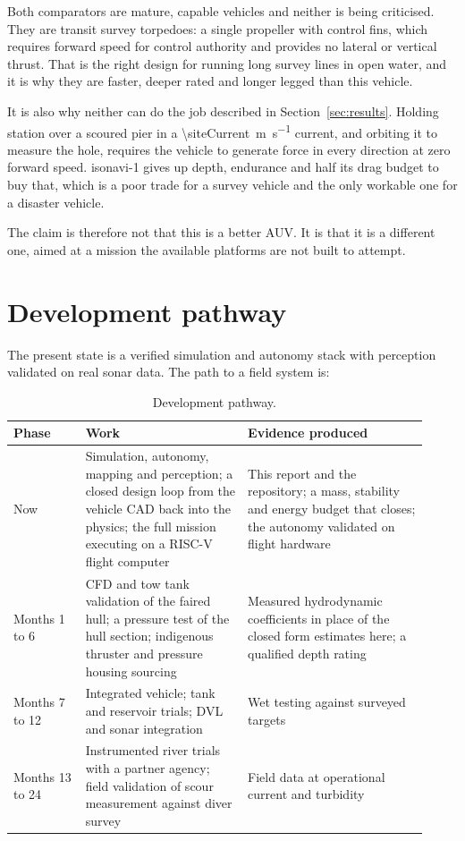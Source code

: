 \documentclass[10pt,a4paper]{article}
\begin{document}
Both comparators are mature, capable vehicles and neither is being criticised.
They are transit survey torpedoes: a single propeller with control fins, which
requires forward speed for control authority and provides no lateral or
vertical thrust. That is the right design for running long survey lines in
open water, and it is why they are faster, deeper rated and longer legged than
this vehicle.

It is also why neither can do the job described in Section~\ref{sec:results}.
Holding station over a scoured pier in a \SI{\siteCurrent}{\metre\per\second}
current, and orbiting it to measure the hole, requires the vehicle to generate
force in every direction at zero forward speed. isonavi-1 gives up depth,
endurance and half its drag budget to buy that, which is a poor trade for a
survey vehicle and the only workable one for a disaster vehicle.

The claim is therefore not that this is a better AUV. It is that it is a
different one, aimed at a mission the available platforms are not built to
attempt.

\section{Development pathway}\label{sec:path}

The present state is a verified simulation and autonomy stack with perception
validated on real sonar data. The path to a field system is:

\begin{table}[htbp]\centering\small
\caption{Development pathway.}
\begin{tabular}{p{0.16\linewidth}p{0.36\linewidth}p{0.40\linewidth}}
\toprule
\textbf{Phase} & \textbf{Work} & \textbf{Evidence produced} \\
\midrule
Now &
Simulation, autonomy, mapping and perception; a closed design loop from the
vehicle CAD back into the physics; the full mission executing on a RISC-V
flight computer &
This report and the repository; a mass, stability and energy budget that
closes; the autonomy validated on flight hardware \\
Months 1 to 6 &
CFD and tow tank validation of the faired hull; a pressure test of the hull
section; indigenous thruster and pressure housing sourcing &
Measured hydrodynamic coefficients in place of the closed form estimates here;
a qualified depth rating \\
Months 7 to 12 &
Integrated vehicle; tank and reservoir trials; DVL and sonar integration &
Wet testing against surveyed targets \\
Months 13 to 24 &
Instrumented river trials with a partner agency; field validation of scour
measurement against diver survey &
Field data at operational current and turbidity \\
\bottomrule
\end{tabular}
\end{table}
\end{document}
